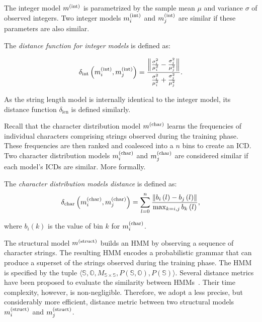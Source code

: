 The integer model $m^{\left(\text{int}\right)}$ is parametrized by the sample mean $\mu$ and variance $\sigma$ of observed integers.  Two integer models $m^{\left(\text{int}\right)}_i$ and $m^{\left(\text{int}\right)}_j$ are similar if these parameters are also similar.

\begin{definition}
  The \emph{distance function for integer models} is defined as:

  \begin{equation}
    \delta_{\text{int}}\left(m^{\left(\text{int}\right)}_i,m^{\left(\text{int}\right)}_j\right)=
    \frac{\left\|\frac{\sigma_i^2}{\mu_i^2}-\frac{\sigma_j^2}{\mu_j^2}\right\|}
    {\frac{\sigma_i^2}{\mu_i^2}+\frac{\sigma_j^2}{\mu_j^2}}.
  \end{equation}
\end{definition}

\begin{note}
  As the string length model is internally identical to the integer model, its distance function $\delta_{\text{len}}$ is defined similarly.
\end{note}

Recall that the character distribution model $m^{\left(\text{char}\right)}$ learns the frequencies of individual characters comprising strings observed during the training phase.  These frequencies are then ranked and coalesced into a $n$ bins to create an \ac{ICD}.  Two character distribution models $m^{\left(\text{char}\right)}_i$ and $m^{\left(\text{char}\right)}_j$ are considered similar if each model's \acp{ICD} are similar. More formally.

\begin{definition}
  The \emph{character distribution models distance} is defined as:
\begin{equation}
  \delta_{\text{char}}\left(m^{\left(\text{char}\right)}_i,m^{\left(\text{char}\right)}_j\right)=
  \sum_{l=0}^{n}\frac{\left\|b_i\left(l\right)-b_j\left(l\right)\right\|}
  {\max_{k=i,j}b_k\left(l\right)},
\end{equation}

where $b_i\left(k\right)$ is the value of bin $k$ for $m^{\left(\text{char}\right)}_i$.
\end{definition}

The structural model $m^{\left(\text{struct}\right)}$ builds an \ac{HMM} by observing a sequence of character strings.  The resulting \ac{HMM} encodes a probabilistic grammar that can produce a superset of the strings observed during the training phase.  The \ac{HMM} is specified by the tuple $\langle\mathbb{S},\mathbb{O},M_{\mathbb{S}\times\mathbb{S}}, P\left(\mathbb{S},\mathbb{O}\right),P\left(\mathbb{S}\right)\rangle$.  Several distance metrics have been proposed to evaluate the similarity between \acp{HMM}~\citep{hmm:metrics:1, hmm:metrics:2, hmm:metrics:3, hmm:metrics:4}.  Their time complexity, however, is non-negligible.  Therefore, we adopt a less precise, but considerably more efficient, distance metric between two structural models $m^{\left(\text{struct}\right)}_i$ and $m^{\left(\text{struct}\right)}_j$.

